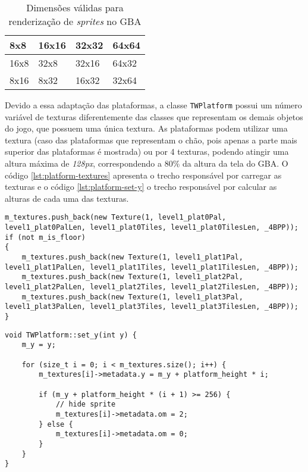 \begin{table}[htb]
\center
\begin{tabular}{|l|l|l|l|}
\hline
8x8  & 16x16 & 32x32 & 64x64 \\ \hline
16x8 & 32x8  & 32x16 & 64x32 \\ \hline
8x16 & 8x32  & 16x32 & 32x64 \\ \hline
\end{tabular}
\caption{Dimensões válidas para renderização de \textit{sprites} no GBA}
\label{table:sprite-sizes}
\end{table}

Devido a essa adaptação das plataformas, a classe \texttt{TWPlatform} possui um número variável de texturas diferentemente das classes que representam os demais objetos do jogo, que possuem uma única textura. As plataformas podem utilizar uma textura (caso das plataformas que representam o chão, pois apenas a parte mais superior das plataformas é mostrada) ou por 4 texturas, podendo atingir uma altura máxima de \textit{128px}, correspondendo a 80\% da altura da tela do GBA. O código \ref{lst:platform-textures} apresenta o trecho responsável por carregar as texturas e o código \ref{lst:platform-set-y} o trecho responsável por calcular as alturas de cada uma das texturas.

\begin{lstlisting}[caption={\texttt{std::vector} com as texturas das plataformas sendo preenchido.},label={lst:platform-textures}]
m_textures.push_back(new Texture(1, level1_plat0Pal, level1_plat0PalLen, level1_plat0Tiles, level1_plat0TilesLen, _4BPP));
if (not m_is_floor)
{
    m_textures.push_back(new Texture(1, level1_plat1Pal, level1_plat1PalLen, level1_plat1Tiles, level1_plat1TilesLen, _4BPP));
    m_textures.push_back(new Texture(1, level1_plat2Pal, level1_plat2PalLen, level1_plat2Tiles, level1_plat2TilesLen, _4BPP));
    m_textures.push_back(new Texture(1, level1_plat3Pal, level1_plat3PalLen, level1_plat3Tiles, level1_plat3TilesLen, _4BPP));
}
\end{lstlisting}

\begin{lstlisting}[caption={Cálculo das alturas das texturas utilizadas nas plataformas},label={lst:platform-set-y}]
void TWPlatform::set_y(int y) {
    m_y = y;

    for (size_t i = 0; i < m_textures.size(); i++) {
        m_textures[i]->metadata.y = m_y + platform_height * i;

        if (m_y + platform_height * (i + 1) >= 256) {
            // hide sprite
            m_textures[i]->metadata.om = 2;
        } else {
            m_textures[i]->metadata.om = 0;
        }
    }
}
\end{lstlisting}

